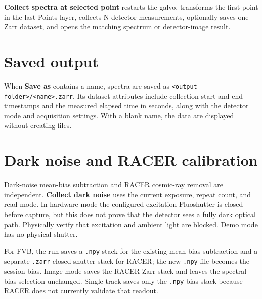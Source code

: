 \documentclass[11pt,oneside]{report}
\newcommand{\ui}[1]{\textbf{#1}}
\newcommand{\code}[1]{\texttt{#1}}
\begin{document}
\ui{Collect spectra at selected point} restarts the galvo, transforms the first
point in the last Points layer, collects N detector measurements, optionally saves
one Zarr dataset, and opens the matching spectrum or detector-image result.

\section*{Saved output}
When \ui{Save as} contains a name, spectra are saved as
\code{<output folder>/<name>.zarr}. Its dataset attributes include collection
start and end timestamps and the measured elapsed time in seconds, along with
the detector mode and acquisition settings. With a blank name, the data are
displayed without creating files.

\section*{Dark noise and RACER calibration}
Dark-noise mean-bias subtraction and RACER cosmic-ray removal are independent.
\ui{Collect dark noise} uses the current exposure, repeat count, and read mode.
In hardware mode the configured excitation Fluoshutter is closed before capture,
but this does not prove that the detector sees a fully dark optical path. Physically
verify that excitation and ambient light are blocked. Demo mode has no physical
shutter.

For FVB, the run saves a \code{.npy} stack for the existing mean-bias subtraction
and a separate \code{.zarr} closed-shutter stack for RACER; the new \code{.npy}
file becomes the session bias. Image mode saves the RACER Zarr stack and leaves the
spectral-bias selection unchanged. Single-track saves only the \code{.npy} bias
stack because RACER does not currently validate that readout.
\end{document}
